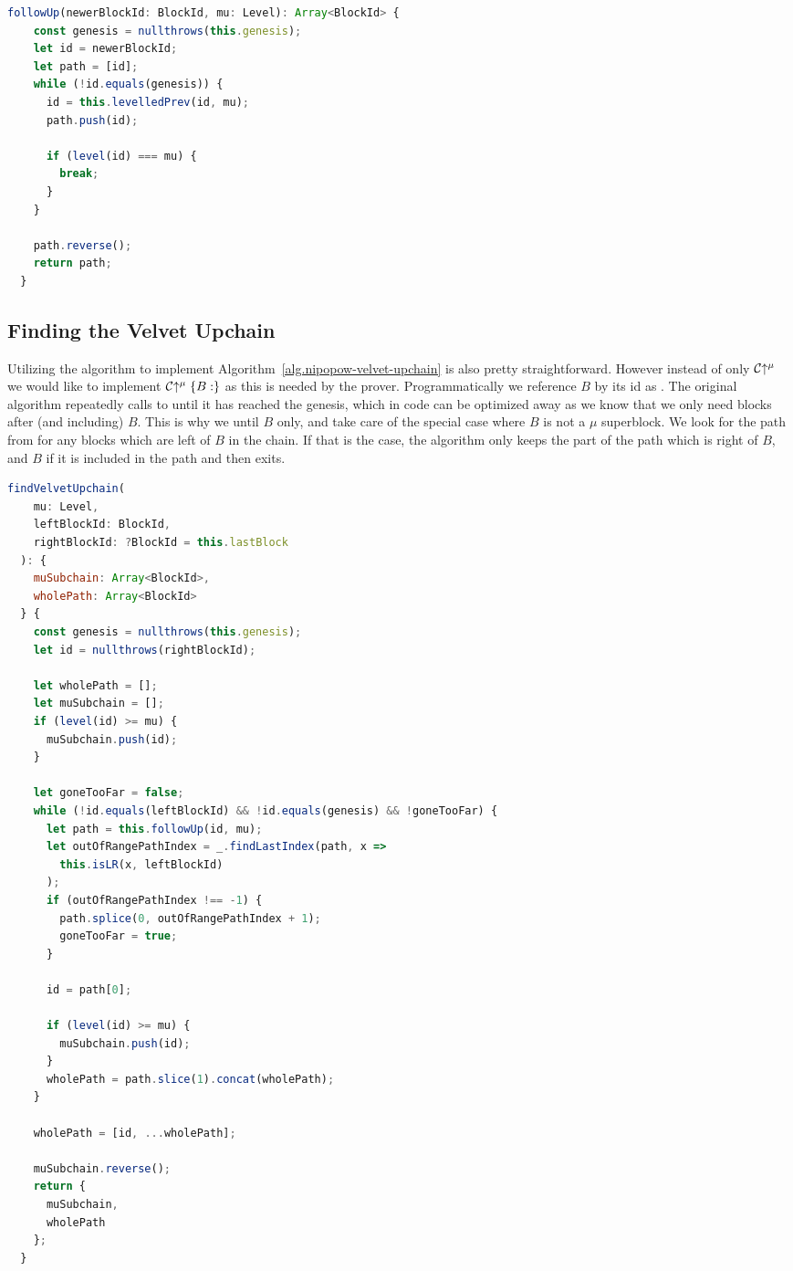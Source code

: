\begin{lstlisting}[language=Javascript]
  followUp(newerBlockId: BlockId, mu: Level): Array<BlockId> {
    const genesis = nullthrows(this.genesis);
    let id = newerBlockId;
    let path = [id];
    while (!id.equals(genesis)) {
      id = this.levelledPrev(id, mu);
      path.push(id);

      if (level(id) === mu) {
        break;
      }
    }

    path.reverse();
    return path;
  }
\end{lstlisting}

\subsection{Finding the Velvet Upchain}
Utilizing the  algorithm to implement Algorithm~\ref{alg.nipopow-velvet-upchain} is also pretty straightforward. However instead of only $\mathcal{C} \negthickspace\uparrow^\mu$ we would like to implement $\mathcal{C}\negthickspace\uparrow^\mu\{B:\}$ as this is needed by the prover. Programmatically we reference $B$ by its id as  . The original algorithm repeatedly calls to  until it has reached the genesis, which in code can be optimized away as we know that we only need blocks after (and including) $B$. This is why we  until $B$ only, and take care of the special case where $B$ is not a $\mu$ superblock. We look for the path from  for any blocks which are left of $B$ in the chain. If that is the case, the algorithm only keeps the part of the path which is right of $B$, and $B$ if it is included in the path and then exits.

\begin{lstlisting}[language=Javascript]
  findVelvetUpchain(
    mu: Level,
    leftBlockId: BlockId,
    rightBlockId: ?BlockId = this.lastBlock
  ): {
    muSubchain: Array<BlockId>,
    wholePath: Array<BlockId>
  } {
    const genesis = nullthrows(this.genesis);
    let id = nullthrows(rightBlockId);

    let wholePath = [];
    let muSubchain = [];
    if (level(id) >= mu) {
      muSubchain.push(id);
    }

    let goneTooFar = false;
    while (!id.equals(leftBlockId) && !id.equals(genesis) && !goneTooFar) {
      let path = this.followUp(id, mu);
      let outOfRangePathIndex = _.findLastIndex(path, x =>
        this.isLR(x, leftBlockId)
      );
      if (outOfRangePathIndex !== -1) {
        path.splice(0, outOfRangePathIndex + 1);
        goneTooFar = true;
      }

      id = path[0];

      if (level(id) >= mu) {
        muSubchain.push(id);
      }
      wholePath = path.slice(1).concat(wholePath);
    }

    wholePath = [id, ...wholePath];

    muSubchain.reverse();
    return {
      muSubchain,
      wholePath
    };
  }
\end{lstlisting}

